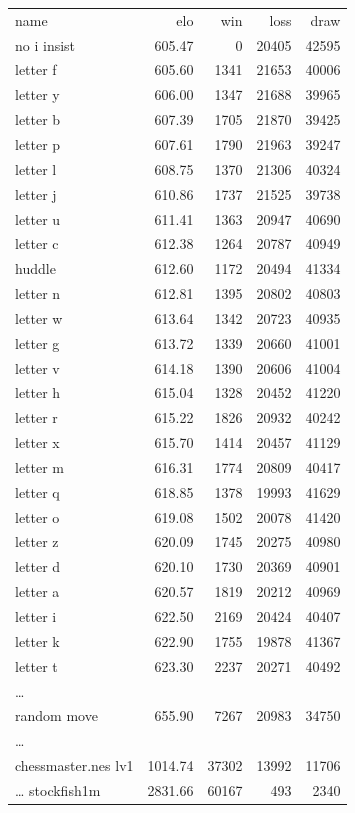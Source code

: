 \documentclass[twocolumn]{article}
\begin{document}
{
  \tiny
\begin{tabular}{lrrrr}
name & elo & win & loss & draw \\
no i insist & 605.47 & 0 & 20405 & 42595 \\
letter f & 605.60 & 1341 & 21653 & 40006 \\
letter y & 606.00 & 1347 & 21688 & 39965 \\
letter b & 607.39 & 1705 & 21870 & 39425 \\
letter p & 607.61 & 1790 & 21963 & 39247 \\
letter l & 608.75 & 1370 & 21306 & 40324 \\
letter j & 610.86 & 1737 & 21525 & 39738 \\
letter u & 611.41 & 1363 & 20947 & 40690 \\
letter c & 612.38 & 1264 & 20787 & 40949 \\
huddle & 612.60 & 1172 & 20494 & 41334 \\
letter n & 612.81 & 1395 & 20802 & 40803 \\
letter w & 613.64 & 1342 & 20723 & 40935 \\
letter g & 613.72 & 1339 & 20660 & 41001 \\
letter v & 614.18 & 1390 & 20606 & 41004 \\
letter h & 615.04 & 1328 & 20452 & 41220 \\
letter r & 615.22 & 1826 & 20932 & 40242 \\
letter x & 615.70 & 1414 & 20457 & 41129 \\
letter m & 616.31 & 1774 & 20809 & 40417 \\
letter q & 618.85 & 1378 & 19993 & 41629 \\
letter o & 619.08 & 1502 & 20078 & 41420 \\
letter z & 620.09 & 1745 & 20275 & 40980 \\
letter d & 620.10 & 1730 & 20369 & 40901 \\
letter a & 620.57 & 1819 & 20212 & 40969 \\
letter i & 622.50 & 2169 & 20424 & 40407 \\
letter k & 622.90 & 1755 & 19878 & 41367 \\
letter t & 623.30 & 2237 & 20271 & 40492 \\
\ldots \\
random move & 655.90 & 7267 & 20983 & 34750 \\
\ldots \\
chessmaster.nes lv1 & 1014.74 & 37302 & 13992 & 11706 \\
\ldots
stockfish1m & 2831.66 & 60167 & 493 & 2340 \\
\end{tabular}
}
\end{document}
